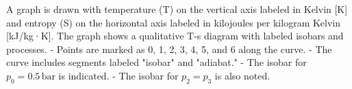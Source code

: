 A graph is drawn with temperature (T) on the vertical axis labeled in Kelvin [K] and entropy (S) on the horizontal axis labeled in kilojoules per kilogram Kelvin [kJ/kg·K]. The graph shows a qualitative T-s diagram with labeled isobars and processes.  
- Points are marked as 0, 1, 2, 3, 4, 5, and 6 along the curve.  
- The curve includes segments labeled "isobar" and "adiabat."  
- The isobar for \( p_0 = 0.5 \, \text{bar} \) is indicated.  
- The isobar for \( p_2 = p_3 \) is also noted.